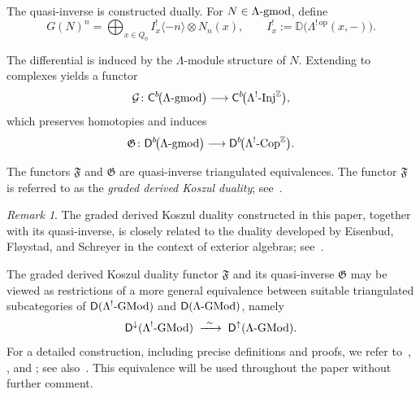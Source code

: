 \documentclass[11pt]{article}
\theoremstyle{definition}
\theoremstyle{remark}
\newtheorem{remark}[theorem]{Remark}
\begin{document}
\medskip

The quasi-inverse is constructed dually. For \(N \in \Lambda\textup{-gmod}\), define
\[
G(N)^{n}
=
\bigoplus_{x\in Q_{0}} I^{!}_{x}\langle -n\rangle \otimes N_{n}(x),
\qquad
I^{!}_{x} := \mathbb{D}\!\bigl(\Lambda^{!\,\mathrm{op}}(x,-)\bigr).
\]

The differential is induced by the \(\Lambda\)-module structure of \(N\). Extending to complexes yields a functor
\[
\mathcal{G}\colon
\mathsf{C}^{b}\!\bigl(\Lambda\textup{-gmod}\bigr)
\longrightarrow
\mathsf{C}^{b}\!\bigl(\Lambda^{!}\textup{-Inj}^{\mathbb{Z}}\bigr),
\]
which preserves homotopies and induces
\[
\mathfrak{G}\colon
\mathsf{D}^{b}\!\bigl(\Lambda\textup{-gmod}\bigr)
\longrightarrow
\mathsf{D}^{b}\!\bigl(\Lambda^{!}\textup{-Cop}^{\mathbb{Z}}\bigr).
\]

\medskip

The functors \(\mathfrak{F}\) and \(\mathfrak{G}\) are quasi-inverse triangulated equivalences. The functor \(\mathfrak{F}\) is referred to as the \emph{graded derived Koszul duality}; see~\cite{4}.
\begin{remark}
The graded derived Koszul duality constructed in this paper, together with its quasi-inverse, is closely related to the duality developed by Eisenbud, Fl{\o}ystad, and Schreyer in the context of exterior algebras; see~\cite{11}.
\end{remark}
\medskip 
The graded derived Koszul duality functor \(\mathfrak{F}\) and its quasi-inverse \(\mathfrak{G}\) may be viewed as restrictions of a more general equivalence between suitable triangulated subcategories of \(\mathsf{D}(\Lambda^{!}\textup{-GMod})\) and \(\mathsf{D}(\Lambda\textup{-GMod})\), namely
\[
\mathsf{D}^{\downarrow}(\Lambda^{!}\textup{-GMod})
\;\xrightarrow{\ \sim\ }\;
\mathsf{D}^{\uparrow}(\Lambda\textup{-GMod}).
\]
For a detailed construction, including precise definitions and proofs, we refer to~\cite[Theorem~5.7]{7}, \cite[Theorem~30]{20}, and \cite[Theorem~2.12.1]{3}; see also~\cite{8}. This equivalence will be used throughout the paper without further comment.
\medskip
\end{document}
